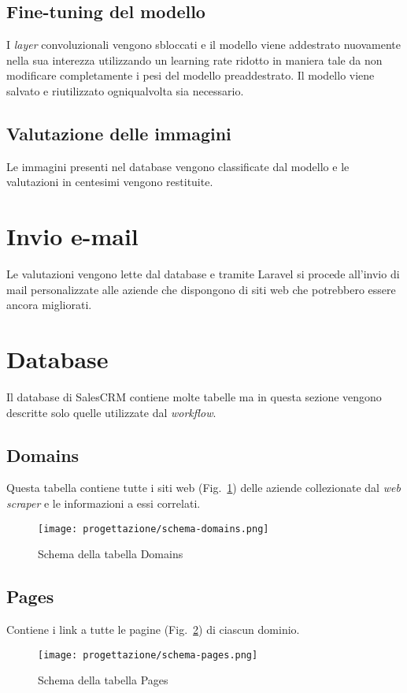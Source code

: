 \subsection{Fine-tuning del modello}
I \emph{layer} convoluzionali vengono sbloccati e il modello viene addestrato nuovamente nella sua interezza utilizzando un learning rate ridotto in maniera tale da non modificare completamente i pesi del modello preaddestrato.
Il modello viene salvato e riutilizzato ogniqualvolta sia necessario.

\subsection{Valutazione delle immagini}
Le immagini presenti nel database vengono classificate dal modello e le valutazioni in centesimi vengono restituite.

\section{Invio e-mail}
Le valutazioni vengono lette dal database e tramite Laravel si procede all'invio di mail personalizzate alle aziende che dispongono di siti web che potrebbero essere ancora migliorati.

\section{Database}
Il database di SalesCRM contiene molte tabelle ma in questa sezione vengono descritte solo quelle utilizzate dal \emph{\gls{workflow}}.

\subsection{Domains}
Questa tabella contiene tutte i siti web (Fig.~\ref{fig:schema-domains}) delle aziende collezionate dal \emph{web scraper} e le informazioni a essi correlati.


\begin{figure}[!h] 
  \centering 
  \texttt{[image: progettazione/schema-domains.png]} 
  \caption{Schema della tabella Domains}
  \label{fig:schema-domains}
\end{figure}

\newpage 

\subsection{Pages}
Contiene i link a tutte le pagine (Fig.~\ref{fig:schema-pages}) di ciascun dominio.

\begin{figure}[!h] 
  \centering 
  \texttt{[image: progettazione/schema-pages.png]} 
  \caption{Schema della tabella Pages}
  \label{fig:schema-pages}
\end{figure}
